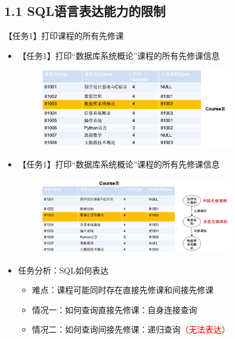 \subsection{1.1 SQL语言表达能力的限制}

\begin{frame}{【任务1】打印课程的所有先修课}
\begin{itemize}
    \item 【任务1】打印“数据库系统概论”课程的所有先修课信息
    \begin{figure}
        \centering
        \includegraphics[width=0.8\textwidth]{figure/fig-1.jpg}
    \end{figure}
\framebreak
    
    \item【任务1】打印“数据库系统概论”课程的所有先修课信息

    \begin{figure}
        \centering
        \includegraphics[width=0.8\textwidth]{figure/fig-2.jpg}
    \end{figure}

\framebreak
\item 任务分析：SQL如何表达
    \begin{itemize}
        \item 难点：课程可能同时存在直接先修课和间接先修课
        \item 情况一：如何查询直接先修课：自身连接查询
        \item 情况二：如何查询间接先修课：递归查询\textcolor{red}{（无法表达）}
    \end{itemize}
\end{itemize}
\end{frame}

